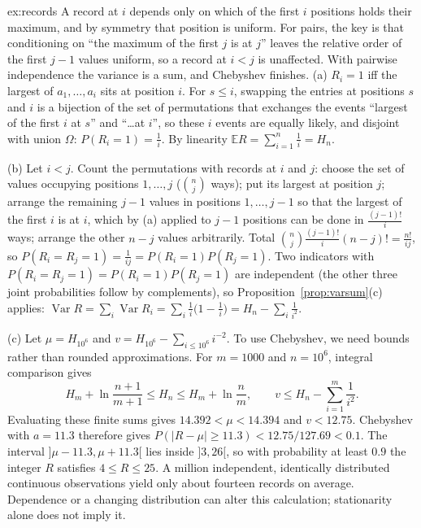 \begin{solution}{ex:records}
\idea A record at $i$ depends only on which of the first $i$ positions holds their maximum, and by symmetry that position is uniform. For pairs, the key is that conditioning on ``the maximum of the first $j$ is at $j$'' leaves the relative order of the first $j-1$ values uniform, so a record at $i<j$ is unaffected. With pairwise independence the variance is a sum, and Chebyshev finishes.
\writeup (a) $R_i=1$ iff the largest of $a_1,\dots,a_i$ sits at position $i$. For $s\le i$, swapping the entries at positions $s$ and $i$ is a bijection of the set of permutations that exchanges the events ``largest of the first $i$ at $s$'' and ``\dots at $i$'', so these $i$ events are equally likely, and disjoint with union $\Omega$: $P(R_i=1)=\frac1i$. By linearity $\mathbb ER=\sum_{i=1}^n\frac1i=H_n$.

(b) Let $i<j$. Count the permutations with records at $i$ and $j$: choose the set of values occupying positions $1,\dots,j$ ($\binom nj$ ways); put its largest at position $j$; arrange the remaining $j-1$ values in positions $1,\dots,j-1$ so that the largest of the first $i$ is at $i$, which by (a) applied to $j-1$ positions can be done in $\frac{(j-1)!}i$ ways; arrange the other $n-j$ values arbitrarily. Total $\binom nj\frac{(j-1)!}i(n-j)!=\frac{n!}{ij}$, so $P(R_i=R_j=1)=\frac1{ij}=P(R_i=1)P(R_j=1)$. Two indicators with $P(R_i=R_j=1)=P(R_i=1)P(R_j=1)$ are independent (the other three joint probabilities follow by complements), so Proposition~\ref{prop:varsum}(c) applies: $\operatorname{Var}R=\sum_i\operatorname{Var}R_i=\sum_i\frac1i\big(1-\frac1i\big)=H_n-\sum_i\frac1{i^2}$.

(c) Let $\mu=H_{10^6}$ and $v=H_{10^6}-\sum_{i\le10^6}i^{-2}$. To use Chebyshev, we need bounds rather than rounded approximations.
For $m=1000$ and $n=10^6$, integral comparison gives
\[
H_m+\ln\frac{n+1}{m+1}\le H_n\le H_m+\ln\frac nm,
\qquad v\le H_n-\sum_{i=1}^{m}\frac1{i^2}.
\]
Evaluating these finite sums gives $14.392<\mu<14.394$ and $v<12.75$.
Chebyshev with $a=11.3$ therefore gives
$P(|R-\mu|\ge11.3)<12.75/127.69<0.1$.
The interval $]\mu-11.3,\mu+11.3[$ lies inside $]3,26[$, so with probability at least $0.9$ the integer $R$ satisfies $4\le R\le25$.
A million independent, identically distributed continuous observations yield only about fourteen records on average. Dependence or a changing distribution can alter this calculation; stationarity alone does not imply it.
\end{solution}

